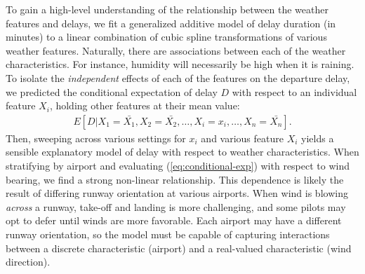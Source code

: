 \documentclass{article}
\begin{document}
To gain a high-level understanding of the relationship between the weather features and delays, we fit a generalized additive model \citep{hastie1990generalized} of delay duration (in minutes) to a linear combination of cubic spline transformations of various weather features. Naturally, there are associations between each of the weather characteristics. For instance, humidity will necessarily be high when it is raining. To isolate the \emph{independent} effects of each of the features on the departure delay, we predicted the conditional expectation of delay $D$ with respect to an individual feature $X_i$, holding other features at their mean value:
\begin{align}
    \label{eq:conditional-exp}
    E[D|X_1=\bar{X_1}, X_2=\bar{X_2}, \ldots, X_i = x_i, \ldots, X_n = \bar{X_n}].
\end{align}
Then, sweeping across various settings for $x_i$ and various feature $X_i$ yields a sensible explanatory model of delay with respect to weather characteristics. When stratifying by airport and evaluating (\ref{eq:conditional-exp}) with respect to wind bearing, we find a strong non-linear relationship. This dependence is likely the result of differing runway orientation at various airports. When wind is blowing \emph{across} a runway, take-off and landing is more challenging, and some pilots may opt to defer until winds are more favorable. Each airport may have a different runway orientation, so the model must be capable of capturing interactions between a discrete characteristic (airport) and a real-valued characteristic (wind direction).
\end{document}
